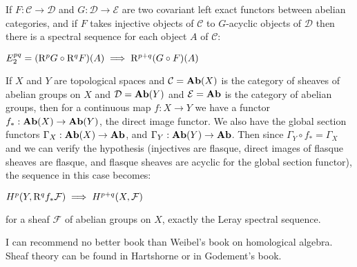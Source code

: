 \documentclass{article}
\begin{document}
If $F :\mathcal{C}\to\mathcal{D}$ and $G :\mathcal{D}\to\mathcal{E}$ are two covariant left exact functors between abelian categories, and if $F$ takes injective objects of $\mathcal{C}$ to $G$-acyclic objects of $\mathcal{D}$ then there is a spectral sequence for each object $A$ of $\mathcal{C}$:

$E_2^{pq} = ({\rm R}^p G \circ{\rm R}^q F)(A) \implies {\rm R}^{p+q} (G\circ F)(A)$

If $X$ and $Y$ are topological spaces and $\mathcal{C} = {\bf Ab}(X)$ is the category of sheaves of abelian groups on $X$ and $\mathcal{D} = {\bf Ab}(Y)$ and $\mathcal{E} = {\bf Ab}$ is the category of abelian groups, then for a continuous map $f : X \to Y$ we have a functor $f_* : {\bf Ab}(X) \to {\bf Ab}(Y)$, the direct image functor.  We also have the global section functors $\Gamma_X : {\bf Ab}(X)\to {\bf Ab}$, and $\Gamma_Y : {\bf Ab}(Y) \to {\bf Ab}$.  Then since $\Gamma_Y \circ f_* = \Gamma_X$ and we can verify the hypothesis (injectives are flasque, direct images of flasque sheaves are flasque, and flasque sheaves are acyclic for the global section functor), the sequence in this case becomes:

$H^p(Y,{\rm R}^q f_*\mathcal{F})\implies H^{p+q}(X,\mathcal{F})$

for a sheaf $\mathcal{F}$ of abelian groups on $X$, exactly the Leray spectral sequence.

I can recommend no better book than Weibel's book on homological algebra.  Sheaf theory can be found in Hartshorne or in Godement's book.
\end{document}
